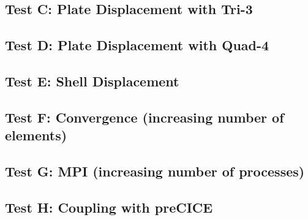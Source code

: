  \subsection{Test C: Plate Displacement with Tri-3}
 \subsection{Test D: Plate Displacement with Quad-4}
 \subsection{Test E: Shell Displacement}
 \subsection{Test F: Convergence (increasing number of elements)}
 \subsection{Test G: MPI (increasing number of processes)}
 \subsection{Test H: Coupling with preCICE}
\newpage
